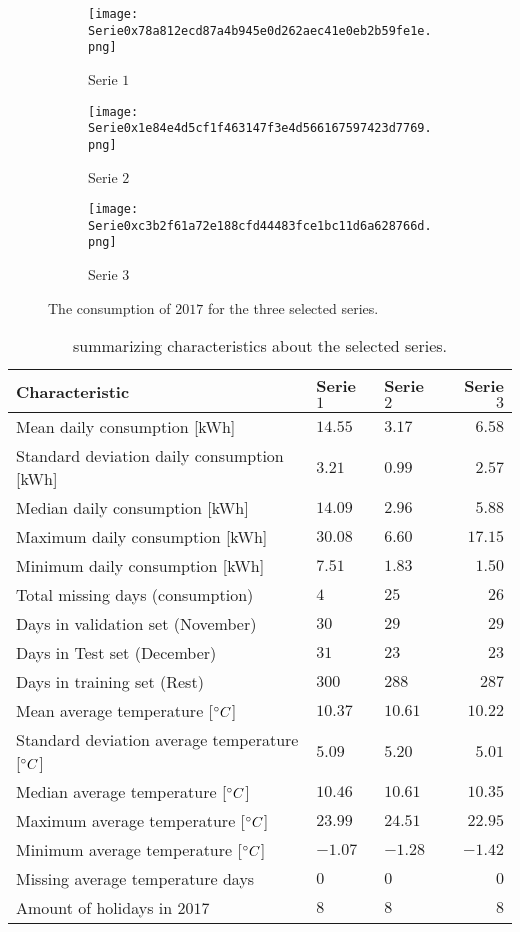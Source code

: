 \begin{figure}[ht]
	\begin{subfigure}{0.32\textwidth}
		\texttt{[image: Serie0x78a812ecd87a4b945e0d262aec41e0eb2b59fe1e.png]}
		\caption{Serie $ 1 $}
	\end{subfigure}	 	
	\begin{subfigure}{0.32\textwidth}
		\texttt{[image: Serie0x1e84e4d5cf1f463147f3e4d566167597423d7769.png]}
		\caption{Serie $ 2 $}
	\end{subfigure}	
	\begin{subfigure}{0.32\textwidth}
		\texttt{[image: Serie0xc3b2f61a72e188cfd44483fce1bc11d6a628766d.png]}
		\caption{Serie $ 3 $}
	\end{subfigure}
	\caption{The consumption of $ 2017 $ for the three selected series. }
\end{figure}

\begin{table}
  \centering
  \begin{tabular}{@{}l|llr@{}} \toprule
  	\textbf{Characteristic}	& \textbf{Serie $ 1 $} & \textbf{Serie $ 2 $} & \textbf{Serie $ 3 $}\\\midrule
    Mean daily consumption [kWh]& $ 14.55 $&$ 3.17 $  & $ 6.58 $ \\
    Standard deviation daily consumption [kWh] &$ 3.21 $ & $ 0.99 $& $ 2.57 $ \\
    Median daily consumption [kWh] & $ 14.09 $ & $ 2.96 $& $ 5.88 $ \\
    Maximum daily consumption [kWh] & $ 30.08 $ & $ 6.60 $ &  $ 17.15 $   \\
    Minimum daily consumption [kWh]& $ 7.51 $ & $ 1.83 $ &  $ 1.50 $   \\
    Total missing days (consumption) & $ 4 $ &$ 25 $ & $ 26 $\\
    Days in validation set (November)&  $ 30 $ & $ 29 $  & $ 29 $ \\
    Days in Test set (December) & $ 31 $    &    $ 23 $  & $ 23 $ \\
    Days in training set (Rest)&   $ 300 $  &  $ 288 $   &  $ 287 $\\
    Mean average temperature [$\degree C$]& $ 10.37 $  &  $ 10.61 $  & $ 10.22 $ \\
    Standard deviation average temperature [$\degree C$]& $ 5.09 $  & $ 5.20 $   & $ 5.01 $ \\
    Median average temperature [$\degree C$] &  $ 10.46 $ &  $ 10.61 $  & $ 10.35 $ \\
    Maximum average temperature [$\degree C$] & $ 23.99 $  & $ 24.51 $   & $ 22.95 $ \\ 
    Minimum average temperature [$\degree C$] & $ -1.07 $  &  $ -1.28 $  & $ -1.42 $ \\
    Missing average temperature days &  $ 0 $ & $ 0 $  & $ 0 $  \\ 
    Amount of holidays in $ 2017 $ & $ 8 $  &  $ 8 $  & $ 8 $ \\\bottomrule
  \end{tabular}
  \caption{summarizing characteristics about the selected series.}
  \label{tab:summ_data}
\end{table}

